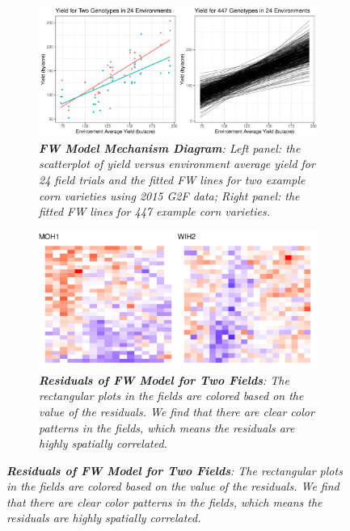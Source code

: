 \documentclass[a0paper,portrait]{baposter}
\begin{document}
\begin{poster}
{\vspace{-1.5em}
  \begin{figure}[H]
  \begin{subfigure}{0.49\textwidth}
    \centering
    \includegraphics[width=0.95\linewidth]{fw_plot_paper.pdf}
    \vspace{-0.5em}
    \caption{\scriptsize{ \textit{ \textbf{FW Model Mechanism Diagram}: Left panel: the scatterplot of yield versus environment average yield for 24 field trials and
the fitted FW lines for two example corn varieties using 2015 G2F data; Right panel: the fitted FW lines for 447 example corn varieties.}} }
  \end{subfigure}
  \begin{subfigure}{0.48\textwidth}
    \centering
    \includegraphics[width=0.95\linewidth]{resid_plot_2.pdf}
    \vspace{-0.5em}
    \caption{ \scriptsize{ \textit{ \textbf{Residuals of FW Model for Two Fields}: 
     The rectangular plots in the fields are colored based on the value of the residuals. We find that there are clear color patterns in the fields, which means the residuals are highly spatially correlated.}} }
  \end{subfigure}
  \end{figure}

}





\end{poster}
\end{document}
